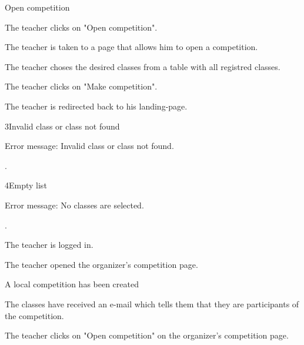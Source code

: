 \begin{uc}{Open competition}

    \begin{uc-mss}
    \item The teacher clicks on "Open competition".
    \item The teacher is taken to a page that allows him to open a competition.
    \item The teacher choses the desired classes from a table with all registred classes.
    \item The teacher clicks on "Make competition".
    \item The teacher is redirected back to his landing-page.
    \end{uc-mss}

    \begin{uc-ext}

        \begin{uc-fail}{3}{Invalid class or class not found}
        \item Error message: Invalid class or class not found.
        \item {}.
        \end{uc-fail}

    \begin{uc-fail}{4}{Empty list}
    \item Error message: No classes are selected.
    \item {}.
    \end{uc-fail}

    \end{uc-ext}

    \begin{uc-pre}
        \item The teacher is logged in.
        \item The teacher opened the organizer's competition page.
    \end{uc-pre}

    \begin{uc-post}
    \item A local competition has been created
    \item The classes have received an e-mail which tells them that they are participants of the competition.
    \end{uc-post}

    \begin{uc-trig}
        The teacher clicks on "Open competition" on the organizer's competition page.
    \end{uc-trig}

\end{uc}
